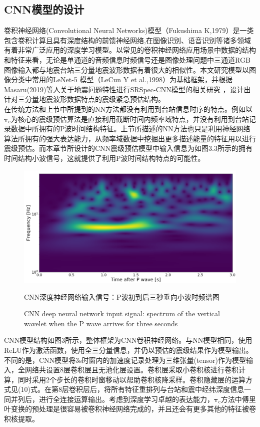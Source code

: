 \subsection{CNN模型的设计}
\indent 卷积神经网络(Convolutional Neural Networks)模型（Fukushima K,1979）是一类包含卷积计算且具有深度结构的前馈神经网络,在图像识别、语音识别等诸多领域有着非常广泛应用的深度学习模型。以常见的卷积神经网络应用场景中数据的结构和特征来看，无论是单通道的音频信息时频信号还是图像处理问题中三通道RGB图像输入都与地震台站三分量地震波形数据有着很大的相似性。本文研究模型以图像分类中常用的LeNet-5 模型（LeCun Y et al.,1998）为基础框架，并根据Masaru(2019)等人关于地震问题特性进行SRSpec-CNN模型的相关研究 ，设计出针对三分量地震波形数据特点的震级紧急预估结构。\\
\indent 在传统方法和上节中所提到的NN方法都没有利用到台站信息时序的特点。例如以$\mathbf{\tau}_{\mathrm{c}}$为核心的震级预估算法是直接利用截断时间内频率域特点，并没有利用到台站记录数据中所拥有的P波时间结构特征。上节所描述的NN方法也只是利用神经网络算法所拥有的强大表达能力，从频率域数据中挖掘出更多描述能量的特征用以进行震级预估。而本章节所设计的CNN震级预估模型中输入信息为如图3.3所示的拥有时间结构小波信号，这就提供了利用P波时间结构特点的可能性。\\
\begin{figure}[h] 
\centering 
 \includegraphics[width=0.99\linewidth]{img/wavelet.jpg} 
 \renewcommand{\figurename}{图} 
\caption{CNN深度神经网络输入信号：P波初到后三秒垂向小波时频谱图} 
\addtocounter{figure}{-1} \vspace{-5pt} 
\renewcommand{\figurename}{Fig} 
\caption{CNN deep neural network input signal: spectrum of the vertical wavelet when the P wave arrives for three seconds} 
\renewcommand{\figurename}{图} 
\label{fig:network-device-influence.png} 
\end{figure}
\indent CNN模型结构如图3所示，整体框架为CNN卷积神经网络。与NN模型相同，使用ReLU作为激活函数，使用全三分量信息，并仍以预估的震级结果作为模型输出。不同的是，CNN模型将3s时窗内的加速度记录处理为三维张量(tensor)作为模型输入，全网络共设置8层卷积层且无池化层设置。卷积层采取小卷积核进行卷积计算，同时采用2个步长的卷积时窗移动以帮助卷积核降采样。卷积隐藏层的运算方式见(10)式。在第8层卷积层后，将所有特征重排列与台站和震中经纬深度信息一同并列后，进行全连接运算输出。考虑到深度学习卓越的表达能力，$\mathbf{\tau}_{\mathrm{c}}$方法中傅里叶变换的预处理是很容易被卷积神经网络完成的，并且还会有更多其他的特征被卷积核提取。\\
